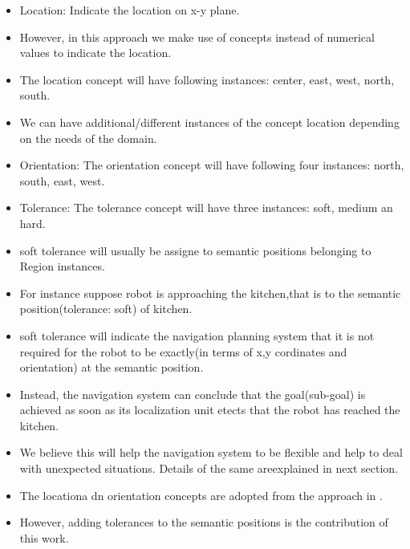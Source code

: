 \begin{itemize}
    
    \item Location: Indicate the location on x-y plane.
    \item However, in this approach we make use of concepts instead of numerical values to indicate the location.
    \item The location concept will have following instances: center, east, west, north, south.
    \item We can have additional/different instances of the concept location depending on the needs of the domain.
    \item Orientation: The orientation concept will have following four instances: north, south, east, west.
    \item Tolerance: The tolerance concept will have three instances: soft, medium an hard.
    \item soft tolerance will usually be assigne to semantic positions belonging to Region instances.
    \item For instance suppose robot is approaching the kitchen,that is to the semantic position(tolerance: soft) of kitchen. 
    \item soft tolerance will indicate the navigation planning system that it is not required for the robot to be exactly(in terms of x,y cordinates and orientation) at the semantic position.
    \item Instead, the navigation system can conclude that the goal(sub-goal) is achieved as soon as its localization unit etects that the robot has reached the kitchen.
    \item We believe this will help the navigation system to be flexible and help to deal with unexpected situations. Details of the same areexplained in next section.
    \item The locationa dn orientation concepts are adopted from the approach in \cite{8}.
    \item However, adding tolerances to the semantic positions is the contribution of this work.
  
\end{itemize}
\fi